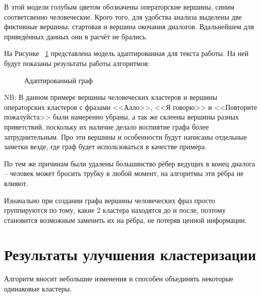 \documentclass[times,specification,annotation]{itmo-student-thesis}
\begin{document}
	В этой модели голубым цветом обозначены операторские вершины, синим соответсвенно человеческие. Крого того, для удобства анализа выделены две фиктивные вершины: стартовая и вершина окочания диалогов. Вдальнейшем для приведённых данных они в расчёт не брались.
	
	На Рисунке ~\ref{fig:graph:adapt} представлена модель адаптированная для текста работы. На ней будут показаны результаты работы алгоритмов:
	
	\begin{figure}[H]
		\caption{Адаптированный граф}
		\label{fig:graph:adapt}
	\end{figure}

	NB: В данном примере вершины человеческих кластеров и вершины операторских кластеров с фразами <<Алло>>, <<Я говорю>> и <<Повторите пожалуйста>> были намеренно убраны, а так же склеены вершины разных приветствий, поскольку их наличие делало воспиятие графа более затруднительным. Про эти вершины и особенности будут написаны отдельные заметки везде, где граф будет использоваться в качестве примера.
	
	По тем же причинам были удалены большинство рёбер ведущих в конец диалога -- человек может бросить трубку в любой момент, на алгоритмы эти рёбра не влияют.
	
	Изначально при создании графа вершины человеческих фраз просто группируются по тому, какие 2 кластера находятся до и после, поэтому становится возможным заменить их на рёбра, не потеряв ценной информации.
	
	\section{Результаты улучшения кластеризации}
	Алгоритм вносит небольшие изменения и способен объединять некоторые одинаковые кластеры. 
	
\end{document}

